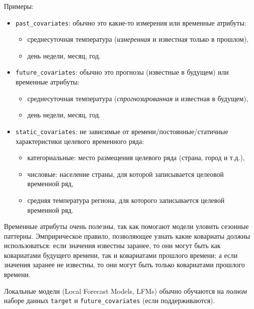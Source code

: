 \documentclass[%
	11pt,
	a4paper,
	utf8,
		]{article}
\begin{document}
Примеры:
\begin{itemize}
	\item \verb|past_covariates|: обычно это какие-то измерения или временные атрибуты:
	\begin{itemize}
		\item среднесуточная температура (\emph{измеренная} и известная только в прошлом),
		
		\item день недели, месяц, год.
	\end{itemize}

    \item \verb|future_covariates|: обычно это прогнозы (известные в будущем) или временные атрибуты:
    \begin{itemize}
    	\item среднесуточная температура (\emph{спрогнозированная} и известная в будущем),
    	
    	\item день недели, месяц, год.
    \end{itemize}

    \item \verb|static_covariates|: не зависимые от времени/постоянные/статичные характеристики целевого временного ряда:
    \begin{itemize}
    	\item категориальные: место размещения целевого ряда (страна, город и т.д.),
    	
    	\item числовые: население страны, для которой записывается целеовой временной ряд,
    	
    	\item средняя температура региона, для которого записывается целевой временной ряд.
    \end{itemize}
\end{itemize}

Временные атрибуты очень полезны, так как помогают модели уловить сезонные паттерны. Эмпририческое правило, позволяющее узнать какие ковариаты должны использоваться: если значения известны заранее, то они могут быть как ковариатами будущего времени, так и ковариатами прошлого времени; а если значения заранее не известны, то они могут быть только ковариатами прошлого времени.

Локальные модели (Local Forecast Models, LFMs) обычно обучаются на \emph{полном} наборе данных \verb|target| и \verb|future_covariates| (если поддерживаются). 
\end{document}

